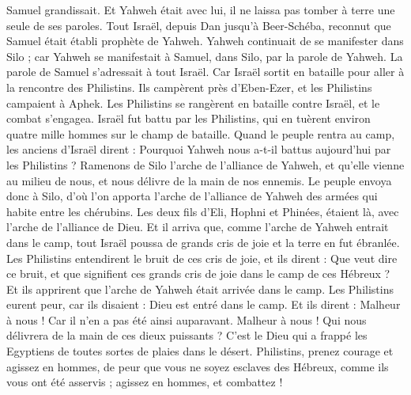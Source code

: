 \begin{multicols}{2}
Samuel grandissait. Et Yahweh était avec lui, il ne laissa pas tomber à terre une seule de ses paroles.
Tout Israël, depuis Dan jusqu'à Beer-Schéba, reconnut que Samuel était établi prophète de Yahweh.
Yahweh continuait de se manifester dans Silo ; car Yahweh se manifestait à Samuel, dans Silo, par la parole de Yahweh.
\VerseOne{}La parole de Samuel s'adressait à tout Israël. Car Israël sortit en bataille pour aller à la rencontre des Philistins. Ils campèrent près d'Eben-Ezer, et les Philistins campaient à Aphek.
Les Philistins se rangèrent en bataille contre Israël, et le combat s'engagea. Israël fut battu par les Philistins, qui en tuèrent environ quatre mille hommes sur le champ de bataille.
Quand le peuple rentra au camp, les anciens d'Israël dirent : Pourquoi Yahweh nous a-t-il battus aujourd'hui par les Philistins ? Ramenons de Silo l'arche de l'alliance de Yahweh, et qu'elle vienne au milieu de nous, et nous délivre de la main de nos ennemis.
Le peuple envoya donc à Silo, d'où l'on apporta l'arche de l'alliance de Yahweh des armées qui habite entre les chérubins. Les deux fils d'Eli, Hophni et Phinées, étaient là, avec l'arche de l'alliance de Dieu.
Et il arriva que, comme l'arche de Yahweh entrait dans le camp, tout Israël poussa de grands cris de joie et la terre en fut ébranlée.
Les Philistins entendirent le bruit de ces cris de joie, et ils dirent : Que veut dire ce bruit, et que signifient ces grands cris de joie dans le camp de ces Hébreux ? Et ils apprirent que l'arche de Yahweh était arrivée dans le camp.
Les Philistins eurent peur, car ils disaient : Dieu est entré dans le camp. Et ils dirent : Malheur à nous ! Car il n'en a pas été ainsi auparavant.
Malheur à nous ! Qui nous délivrera de la main de ces dieux puissants ? C'est le Dieu qui a frappé les Egyptiens de toutes sortes de plaies dans le désert.
Philistins, prenez courage et agissez en hommes, de peur que vous ne soyez esclaves des Hébreux, comme ils vous ont été asservis ; agissez en hommes, et combattez !

\end{multicols}
